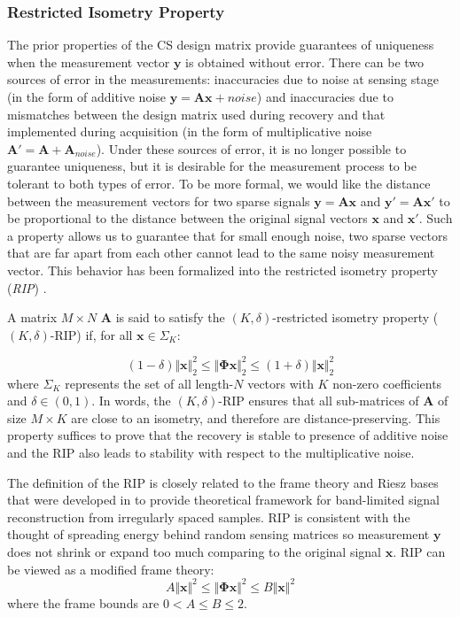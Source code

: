 \documentclass[journal]{IEEEtran}
\begin{document}
\subsubsection{Restricted Isometry Property}
The prior properties of the CS design matrix provide guarantees of uniqueness when the measurement vector $\boldsymbol{y}$ is obtained without error. There can be two sources of error in the measurements: inaccuracies due to noise at sensing stage (in the form of additive noise $\boldsymbol{y}=\boldsymbol{A}\boldsymbol{x}+noise$) and inaccuracies due to mismatches between the design matrix used during recovery and that implemented during acquisition (in the form of multiplicative noise $\boldsymbol{A'}=\boldsymbol{A}+\boldsymbol{A}_{noise}$). Under these sources of error, it is no longer possible to guarantee uniqueness, but it is desirable for the measurement process to be tolerant to both types of error. To be more formal, we would like the distance between the measurement vectors for two sparse signals $\boldsymbol{y}=\boldsymbol{A}\boldsymbol{x}$ and $\boldsymbol{y'}=\boldsymbol{A}\boldsymbol{x'}$ to be proportional to the distance between the original signal vectors $\boldsymbol{x}$ and $\boldsymbol{x'}$. Such a property allows us to guarantee that for small enough noise, two sparse vectors that are far apart from each other cannot lead to the same noisy measurement vector. This behavior has been formalized into the restricted isometry property (\textit{RIP}) \cite{Moreira2014, Romberg2013, CANDES2008589, Blanchard2011}. 

A matrix $M\times N$ $\boldsymbol{A}$ is said to satisfy the $(K,\delta)$-restricted isometry property ($(K,\delta)$-RIP) if, for all $\boldsymbol{x}\in\Sigma_K$:

\begin{equation} \label{eq:rip}
	(1-\delta)\Vert \boldsymbol{x}\Vert^2_2\leq\Vert\boldsymbol{\Phi }\boldsymbol{x}\Vert_2^2\leq(1+\delta)\Vert\boldsymbol{x}\Vert_2^2
\end{equation}
%
where $\Sigma_K$ represents the set of all length-$N$ vectors with $K$ non-zero coefficients and $\delta \in (0,1)$. In words, the $(K,\delta)$-RIP ensures that all sub-matrices of $\boldsymbol{A}$ of size $M\times K$ are close to an isometry, and therefore are distance-preserving. This property suffices to prove that the recovery is stable to presence of additive noise and the RIP also leads to stability with respect to the multiplicative noise.

The definition of the RIP is closely related to the frame theory and Riesz bases that were developed in \cite{duffin1952class} to provide theoretical framework for band-limited signal reconstruction from irregularly spaced samples. RIP is consistent with the thought of spreading energy behind random sensing matrices so measurement $\boldsymbol{y}$ does not shrink or expand too much comparing to the original signal $\boldsymbol{x}$. RIP can be viewed as a modified frame theory:
%
\begin{equation} \label{eq:frame}
	A\Vert \boldsymbol{x}\Vert^2\leq\Vert\boldsymbol{\Phi }\boldsymbol{x}\Vert^2\leq B\Vert\boldsymbol{x}\Vert^2
\end{equation}
%
where the frame bounds are $0<A\leq B \leq 2$.
\end{document}
